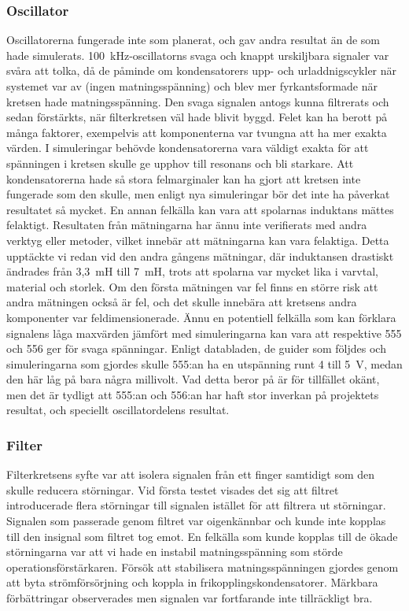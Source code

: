 \documentclass[a4paper]{article}
\makeatletter
\let\\\@raggedtwoe@savedcr%
\makeatother
\begin{document}
\begin{sloppypar}
    \subsubsection{Oscillator}
    Oscillatorerna fungerade inte som planerat, och gav andra resultat än de som hade simulerats.
    100~kHz-oscillatorns svaga och knappt urskiljbara signaler var svåra att tolka, då de påminde om kondensatorers upp- och urladdnigscykler när systemet var av (ingen matningsspänning) och blev mer fyrkantsformade när kretsen hade matningsspänning.
    Den svaga signalen antogs kunna filtrerats och sedan förstärkts, när filterkretsen väl hade blivit byggd.
    Felet kan ha berott på många faktorer, exempelvis att komponenterna var tvungna att ha mer exakta värden.
    I simuleringar behövde kondensatorerna vara väldigt exakta för att spänningen i kretsen skulle ge upphov till resonans och bli starkare.
    Att kondensatorerna hade så stora felmarginaler kan ha gjort att kretsen inte fungerade som den skulle, men enligt nya simuleringar bör det inte ha påverkat resultatet så mycket.
    \\\\
    En annan felkälla kan vara att spolarnas induktans mättes felaktigt. Resultaten från mätningarna har ännu inte verifierats med andra verktyg eller metoder, vilket innebär att mätningarna kan vara felaktiga.
    Detta upptäckte vi redan vid den andra gångens mätningar, där induktansen drastiskt ändrades från 3,3~mH till 7~mH, trots att spolarna var mycket lika i varvtal, material och storlek. Om den första mätningen var fel finns en större risk att andra mätningen också är fel, och det skulle innebära att kretsens andra komponenter var feldimensionerade.
    \\\\
    Ännu en potentiell felkälla som kan förklara signalens låga maxvärden jämfört med simuleringarna kan vara att respektive 555 och 556 ger för svaga spänningar. Enligt databladen, de guider som följdes och simuleringarna som gjordes skulle 555:an ha en utspänning runt 4 till 5~V, medan den här låg på bara några millivolt.
    Vad detta beror på är för tillfället okänt, men det är tydligt att 555:an och 556:an har haft stor inverkan på projektets resultat, och speciellt oscillatordelens resultat.
    \subsubsection{Filter}
    Filterkretsens syfte var att isolera signalen från ett finger samtidigt som den skulle reducera störningar. Vid första testet
    visades det sig att filtret introducerade flera störningar till signalen istället för att filtrera ut störningar. Signalen
    som passerade genom filtret var oigenkännbar och kunde inte kopplas till den insignal som filtret tog emot. En felkälla som
    kunde kopplas till de ökade störningarna var att vi hade en instabil matningsspänning som störde operationsförstärkaren.
    Försök att stabilisera matningsspänningen gjordes genom att byta strömförsörjning och koppla in frikopplingskondensatorer.
    Märkbara förbättringar observerades men signalen var fortfarande inte tillräckligt bra.


\end{sloppypar}
\end{document}
